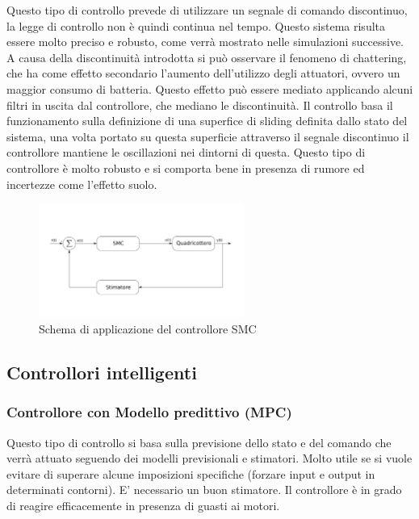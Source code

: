 Questo tipo di controllo prevede di utilizzare un segnale di comando discontinuo, la legge di controllo non è quindi continua nel tempo. Questo sistema risulta essere molto preciso e robusto, come verrà mostrato nelle simulazioni successive. A causa della discontinuità introdotta si può  osservare il fenomeno di chattering, che ha come effetto secondario l'aumento dell'utilizzo degli attuatori, ovvero un maggior consumo di batteria. Questo effetto può essere mediato applicando alcuni filtri in uscita dal controllore, che mediano le discontinuità. Il controllo basa il funzionamento sulla definizione di una superfice di sliding definita dallo stato del sistema, una volta portato su questa superficie attraverso il segnale discontinuo il controllore mantiene le oscillazioni nei dintorni di questa. Questo tipo di controllore è molto robusto e si comporta bene in presenza di rumore ed incertezze come l'effetto suolo.

\begin{figure}
	\centering
	\includegraphics[width=0.6\textwidth]{SistemaQuadrirotore/Figure/SMC}
	\caption{Schema di applicazione del controllore SMC}
\end{figure}

\subsection{Controllori intelligenti}

\subsubsection{Controllore con Modello predittivo (MPC)}

Questo tipo di controllo si basa sulla previsione dello stato e del comando che verrà attuato seguendo dei modelli previsionali e stimatori. Molto utile se si vuole evitare di superare alcune imposizioni specifiche (forzare input e output in determinati contorni).
E' necessario un buon stimatore. Il controllore è in grado di reagire efficacemente in presenza di guasti ai motori.

